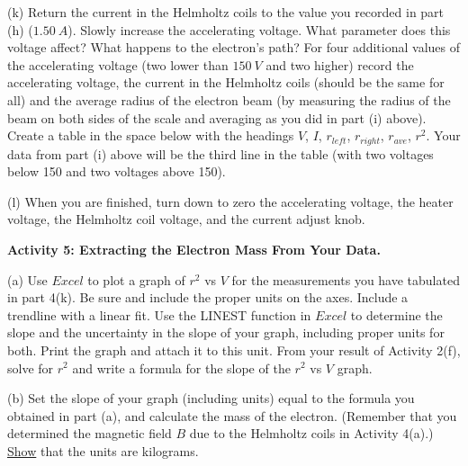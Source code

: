  (k) Return the current in the Helmholtz coils to the value you recorded in 
part (h) ($1.50~A$). Slowly increase the accelerating voltage. What parameter 
does this voltage affect? What happens to the electron's path?
For four additional values of the accelerating voltage (two lower than $150~V$
 and two higher) record the accelerating voltage, the current in the 
Helmholtz coils (should be the same for all) 
and the average radius of the electron beam (by measuring the radius of the 
beam on both sides of the scale and averaging as you did in part (i) above). 
Create a table in the space below with the headings $V$, $I$, $r_{left}$, 
$r_{right}$, $r_{ave}$, $r^2$. Your data from part (i) above will be the third 
line in the table (with two voltages below 150 and two voltages above 150).

\newpage

(l) When you are finished, turn down to zero the accelerating voltage, the 
heater voltage, the Helmholtz coil voltage, and the current adjust knob.
\vspace{10mm}

\textbf{Activity 5: Extracting the Electron Mass From Your Data.}


(a) Use $Excel$ to plot a graph of $r^2$ vs $V$ for the measurements you have 
tabulated in part 4(k). Be sure and include the proper units on the axes. 
Include a trendline with a linear fit. Use the LINEST function in $Excel$ to 
determine the slope and the uncertainty in the slope of your graph, including 
proper units for both. Print the graph and attach it to this unit. 
From your result of Activity 2(f), solve for $r^2$ and write a formula for the 
slope of the $r^2$ vs $V$ graph.
\vspace{50mm}

(b) Set the slope of your graph (including units) equal to the formula you 
obtained in part (a), and calculate the mass of the electron. (Remember that you determined the magnetic field $B$ due to the Helmholtz coils in Activity 4(a).)
\underline{Show} that the units are kilograms.
\vspace{50mm}

